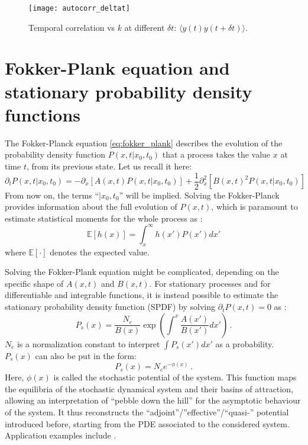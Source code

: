 \begin{figure}[h!]
	\centering
	\texttt{[image: autocorr\_deltat]}
	\caption{\small Temporal correlation vs $k$ at different $\delta t$: $\langle y(t)y(t+\delta t) \rangle$. }
	\label{fig:covar_delta}
\end{figure}



\tocless\section{Fokker-Plank equation and stationary probability density functions}
\label{sec:fokker_plank}

The Fokker-Planck equation \ref{eq:fokker_plank} describes the evolution of the probability density function $P(x,t|x_0,t_0)$ that a process takes the value $x$ at time $t$, from its previous state. Let us recall it here:
\begin{equation}
	\partial_t P(x,t | x_0, t_0) = - \partial_x \left[A(x,t) P(x,t | x_0, t_0) \right] + \frac{1}{2} \partial^2_x \left[B(x,t)^2 P(x,t | x_0, t_0) \right]
\end{equation}
 From now on, the terms ``$|x_0,t_0$'' will be implied. Solving the Fokker-Planck provides information about the full evolution of $P(x,t)$, which is paramount to estimate statistical moments for the whole process as \citep{papoulis2002probability}:
\begin{equation}
	\mathbb{E}[h(x)] = \int_{x}^{\infty} h(x') P(x') dx' 
\end{equation}
where $\mathbb{E}[\cdot ] $ denotes the expected value. 


Solving the Fokker-Plank equation might be complicated, depending on the specific shape of $A(x,t)$ and $B(x,t)$. For stationary processes and for differentiable and integrable functions, it is instead possible to estimate the stationary probability density function (\gls{SPDF}) by solving $\partial_t P(x,t) = 0$ as \citep{Risken1991}:
\begin{equation}
	P_s(x) = \frac{N_c}{B(x)}\exp\left(\int^x \frac{A(x')}{B(x')} dx' \right) \, .
\end{equation}
$N_c$ is a normalization constant to interpret $\int P_s(x') dx'$ as a probability. $P_s(x)$ can also be put in the form:
\begin{equation}
	P_s(x) = N_c e^{-\phi(x)} \, . 
\end{equation}
Here, $\phi(x)$ is called the stochastic potential of the system. This function maps the equilibria of the stochastic dynamical system and their basins of attraction, allowing an interpretation of ``pebble down the hill'' for the asymptotic behaviour of the system. It thus reconstructs the ``adjoint''/''effective''/``quasi-'' potential introduced before, starting from the \gls{PDE} associated to the considered system. Application examples include \citep{Sharma2016,Su2019}. \\




